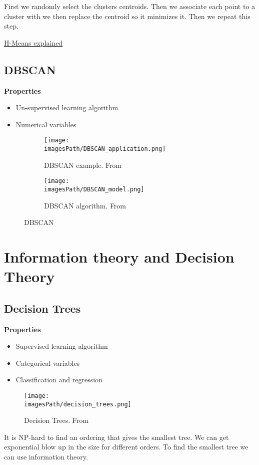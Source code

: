 \begin{multicols}{2}
First we randomly select the clusters centroids. Then we associate each 
point to a cluster with we then replace the centroid so it minimizes it.
Then we repeat this step.  

\href{https://www.youtube.com/watch?v=4b5d3muPQmA}{H-Means explained}

\subsection{DBSCAN}
\textbf{Properties}
\begin{itemize}
    \item Un-supervised learning algorithm
    \item Numerical variables 
\end{itemize}


\begin{figure}[H]
     \centering
     \begin{subfigure}[b]{6cm}
         \centering
         \texttt{[image: \\imagesPath/DBSCAN\_application.png]}
         \caption{DBSCAN example. From \cite{iml}}
     \end{subfigure}
     \hfill
     \begin{subfigure}[b]{6cm}
         \centering
         \texttt{[image: \\imagesPath/DBSCAN\_model.png]}
         \caption{DBSCAN algorithm. From \cite{iml}}
     \end{subfigure}
    \caption{DBSCAN}
    \label{fig:DBSCAN}
\end{figure}



\section{Information theory and Decision Theory}
\subsection{Decision Trees}
\textbf{Properties}
\begin{itemize}
    \item Supervised learning algorithm
    \item Categorical variables 
    \item Classification and regression
\end{itemize}

\begin{figure}[H]
    \centering
    \texttt{[image: \\imagesPath/decision\_trees.png]}
    \caption{Decision Trees. From \cite{iml}}
\end{figure}
It is NP-hard to find an ordering that gives the smallest tree.
We can get exponential blow up in the size for different orders.
To find the smallest tree we can use information theory.


\end{multicols}
